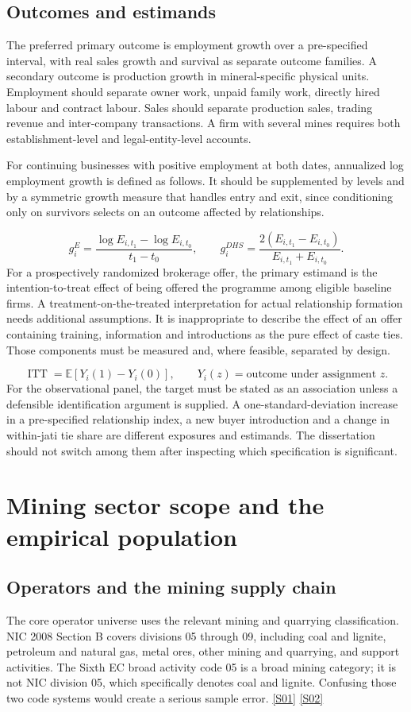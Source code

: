 \documentclass[11pt,a4paper]{report}
\begin{document}
\section{Outcomes and estimands}
The preferred primary outcome is employment growth over a pre-specified interval, with real sales growth and survival as separate outcome families. A secondary outcome is production growth in mineral-specific physical units. Employment should separate owner work, unpaid family work, directly hired labour and contract labour. Sales should separate production sales, trading revenue and inter-company transactions. A firm with several mines requires both establishment-level and legal-entity-level accounts.

For continuing businesses with positive employment at both dates, annualized log employment growth is defined as follows. It should be supplemented by levels and by a symmetric growth measure that handles entry and exit, since conditioning only on survivors selects on an outcome affected by relationships.

\[
g_i^{E}=\frac{\log E_{i,t_1}-\log E_{i,t_0}}{t_1-t_0},\qquad
g_i^{DHS}=\frac{2(E_{i,t_1}-E_{i,t_0})}{E_{i,t_1}+E_{i,t_0}}.
\]
For a prospectively randomized brokerage offer, the primary estimand is the intention-to-treat effect of being offered the programme among eligible baseline firms. A treatment-on-the-treated interpretation for actual relationship formation needs additional assumptions. It is inappropriate to describe the effect of an offer containing training, information and introductions as the pure effect of caste ties. Those components must be measured and, where feasible, separated by design.

\[
\operatorname{ITT}=\mathbb{E}[Y_i(1)-Y_i(0)],\qquad
Y_i(z)=\text{outcome under assignment }z.
\]
For the observational panel, the target must be stated as an association unless a defensible identification argument is supplied. A one-standard-deviation increase in a pre-specified relationship index, a new buyer introduction and a change in within-jati tie share are different exposures and estimands. The dissertation should not switch among them after inspecting which specification is significant.

\chapter{Mining sector scope and the empirical population}
\section{Operators and the mining supply chain}
The core operator universe uses the relevant mining and quarrying classification. NIC 2008 Section B covers divisions 05 through 09, including coal and lignite, petroleum and natural gas, metal ores, other mining and quarrying, and support activities. The Sixth EC broad activity code 05 is a broad mining category; it is not NIC division 05, which specifically denotes coal and lignite. Confusing those two code systems would create a serious sample error. \hyperlink{S01}{[S01]} \hyperlink{S02}{[S02]}
\end{document}
